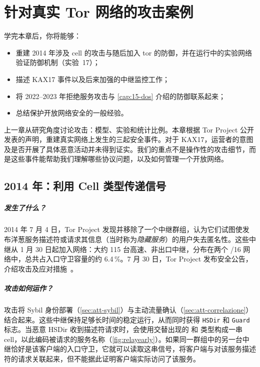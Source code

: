 \chapter{针对真实 Tor 网络的攻击案例}\label{cap:27-casi-rete}

\begin{obiettivi}
学完本章后，你将能够：
\begin{itemize}[nosep]
  \item 重建 2014 年涉及  cell 的攻击与随后加入 tor 的防御，并在运行中的实验网络验证防御机制（实验~17）；
  \item 描述 KAX17 事件以及后来加强的中继监控工作；
  \item 将 2022--2023 年拒绝服务攻击与 \cref{cap:15-dos} 介绍的防御联系起来；
  \item 总结保护开放网络安全的一般经验。
\end{itemize}
\end{obiettivi}

上一章从研究角度讨论攻击：模型、实验和统计比例。本章根据 Tor Project 公开发表的声明，重建真实网络上发生的三起安全事件。对于 KAX17，运营者的意图及是否开展了具体恶意活动并未得到证实。我们的重点不是操作性的攻击细节，而是这些事件能帮助我们理解哪些协议问题，以及如何管理一个开放网络。

\section{2014 年：利用 Cell 类型传递信号}\label{sec:casi-relayearly}

\paragraph{发生了什么？}2014 年 7 月 4 日，Tor Project 发现并移除了一个中继群组，认为它们试图使发布洋葱服务描述符或请求其信息（当时称为\emph{隐藏服务}）的用户失去匿名性。这些中继从 1 月 30 日起加入网络：大约 115 台高速、非出口中继，分布在两个 /16 网络中，总共占入口守卫容量的约 6.4\,\%。7 月 30 日，Tor Project 发布安全公告，介绍攻击及应对措施~\cite{torblog2014relayearly}。

\paragraph{攻击如何运作？}攻击将 Sybil 身份部署（\cref{sec:att-sybil}）与主动流量确认（\cref{sec:att-correlazione}）结合起来。这些中继保持足够长时间的稳定运行，从而同时获得 \texttt{HSDir} 和 \texttt{Guard} 标志。当恶意 HSDir 收到描述符请求时，会使用交替出现的  和  类型构成一串 cell，以此编码被请求的服务名称（\cref{fig:relayearly}）。如果同一群组中的另一台中继恰好是该客户端的入口守卫，它就可以读取这串信号，将客户端与对该服务描述符的请求关联起来，但不能据此证明客户端实际访问了该服务。

